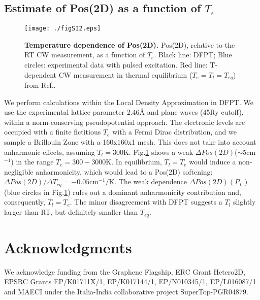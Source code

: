 \documentclass[aps, prl,twocolumn]{revtex4}
\begin{document}
\subsection*{Estimate of Pos(2D) as a function of $T_e$}

\begin{figure}
	\centerline{\texttt{[image: ./figSI2.eps]}}
	\caption{\textbf{Temperature dependence of Pos(2D).} Pos(2D), relative to the RT CW measurement, as a function of $T_e$. Black line: DFPT; Blue circles: experimental data with pulsed excitation. Red line: T-dependent CW measurement in thermal equilibrium ($T_e=T_l=T_{eq}$) from Ref.\cite{Nef2014}.}
	\label{figS2}
\end{figure}
We perform calculations within the Local Density Approximation in DFPT\cite{Gironcoli1995,Giannozzi2009}. We use the experimental lattice parameter
2.46\AA\cite{wang_crystal_2012} and plane waves (45Ry cutoff), within a norm-conserving pseudopotential approach\cite{Giannozzi2009}. The electronic levels are occupied with a finite fictitious $T_e$ with a Fermi Dirac distribution, and we sample a Brillouin Zone with a 160x160x1 mesh. This does not take into account anharmonic effects, assuming $T_l=300$K. Fig.\ref{figS2} shows a weak $\Delta Pos(2D)$($\sim 5$cm$^{-1}$) in the range $T_e=300-3000$K. In equilibrium, $T_l=T_e$ would induce a non-negligible anharmonicity\cite{Nef2014}, which would lead to a Pos(2D) softening: $\Delta Pos(2D)/\Delta T_{eq}=-0.05$cm$^{-1}/$K. The weak dependence $\Delta Pos(2D)(P_L)$ (blue circles in Fig.\ref{figS2}) rules out a dominant anharmonicity contribution and, consequently, $T_l=T_e$. The minor disagreement with DFPT suggests a $T_l$ slightly larger than RT, but definitely smaller than $T_{eq}$.
\section*{Acknowledgments}
We acknowledge funding from the Graphene Flagship, ERC Grant Hetero2D,  EPSRC Grants EP/K01711X/1, EP/K017144/1, EP/N010345/1,  EP/L016087/1 and MAECI under the Italia-India collaborative project SuperTop-PGR04879.
\end{document}
